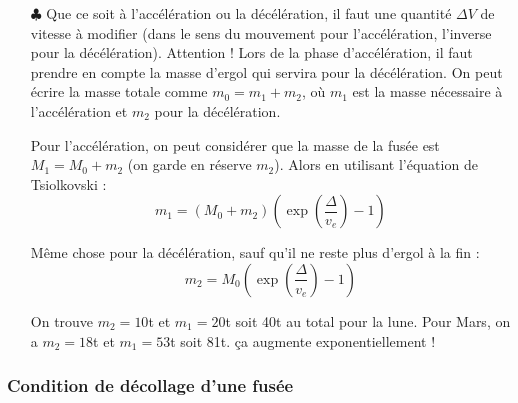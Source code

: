 \documentclass{report}
\begin{document}
\begin{itemize}
\item[$\clubsuit$]  Que ce soit à l'accélération ou la décélération, il faut une quantité $\Delta V$ de vitesse à modifier (dans le sens du mouvement pour l'accélération, l'inverse pour la décélération). Attention ! Lors de la phase d'accélération, il faut prendre en compte la masse d'ergol qui servira pour la décélération. On peut écrire la masse totale comme $m_0=m_1+m_2$, où $m_1$ est la masse nécessaire à l'accélération et $m_2$ pour la décélération. 

Pour l'accélération, on peut considérer que la masse de la fusée est $M_1=M_0+m_2$ (on garde en réserve $m_2$). Alors en utilisant l'équation de Tsiolkovski :
\begin{equation}
	m_1=(M_0+m_2)\left(\exp\left(\frac{\Delta}{v_e} \right) -1 \right) 
\end{equation}

Même chose pour la décélération, sauf qu'il ne reste plus d'ergol à la fin :
\begin{equation}
	m_2=M_0\left(\exp\left(\frac{\Delta}{v_e} \right) -1 \right) 
\end{equation}

On trouve $m_2=10$t et $m_1=20$t soit 40t au total pour la lune. Pour Mars, on a $m_2=18$t et $m_1=53$t soit 81t. ça augmente exponentiellement !
\end{itemize}

\subsubsection*{Condition de décollage d'une fusée}
\end{document}
